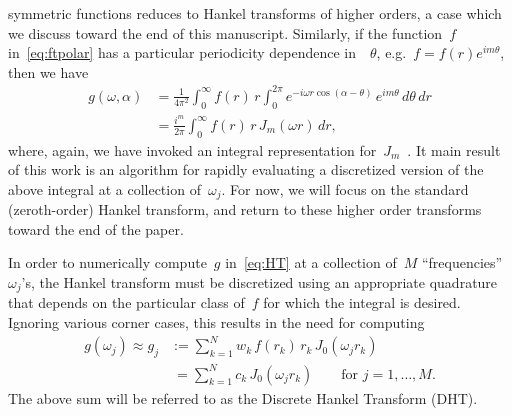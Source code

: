 symmetric functions reduces to Hankel transforms of higher orders, a case which
we discuss toward the end of this manuscript. Similarly, if the function~$f$
in~\eqref{eq:ftpolar} has a particular periodicity dependence in~~$\theta$,
e.g.~$f = f(r)e^{im\theta}$, then we have
\begin{equation}
  \begin{aligned}
  g(\omega,\alpha) &= \frac{1}{4\pi^2} \int_0^\infty f(r) \, r \int_0^{2\pi} 
  e^{-i \omega r \cos(\alpha - \theta) } \, e^{im\theta}  \, d\theta \, dr \\
  &= \frac{i^m}{2\pi} \int_0^\infty f(r) \, r \, J_m(\omega r)  \, dr,
  \end{aligned}
\end{equation}
where, again, we have invoked an integral representation
for~$J_m$~\cite{olver2010nist}. It main result of this work is an algorithm for
rapidly evaluating a discretized version of the above integral at a collection
of~$\omega_j$. For now, we will focus on the standard (zeroth-order) Hankel
transform, and return to these higher order transforms toward the end of the
paper.

In order to numerically compute~$g$ in~\eqref{eq:HT} at a collection of~$M$
``frequencies''~$\omega_j$'s, the Hankel transform must be discretized using an
appropriate quadrature that depends on the particular class of~$f$ for which the
integral is desired. Ignoring various corner cases, this results in the need for
computing
\begin{equation} \label{eq:DHT}
  \begin{aligned}
  g(\omega_j) \approx 
  g_j &:= \sum_{k=1}^N w_k \, f(r_k) \, r_k \, J_0(\omega_j r_k) \\
  &\ = \sum_{k=1}^N c_k \, J_0(\omega_j r_k)
   \qquad \text{for } j = 1, \ldots, M.
  \end{aligned}
\end{equation}
The above sum will be referred to as the Discrete Hankel Transform (DHT). 

